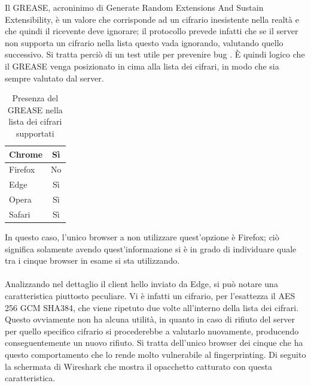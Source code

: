 Il GREASE,  acroninimo di Generate Random Extensions And Sustain Extensibility, è un valore che corrisponde ad un cifrario inesistente nella realtà e che quindi il ricevente deve ignorare; il protocollo prevede infatti che se il server non supporta un cifrario nella lista questo vada ignorando, valutando quello successivo. Si tratta perciò di un test utile per prevenire bug \cite{GREASE}.
È quindi logico che il GREASE venga posizionato in cima alla lista dei cifrari, in modo che sia sempre valutato dal server.
\\
\begin{table}[H]
	\centering
	\begin{tabular}{| l | c |}
			\hline
		\rowcolor[HTML]{FDD20A}Chrome & Sì
		\\
		\hline
		\rowcolor[HTML]{FF9500}Firefox & No
		\\
		\hline
		\rowcolor[HTML]{3277BC}Edge & Sì
		\\
		\hline
		\rowcolor[HTML]{CB0B1E}Opera & Sì
		\\
		\hline
		\rowcolor[HTML]{0FB5EE} Safari & Sì
		\\
		\hline
	\end{tabular}
	\caption{Presenza del GREASE nella lista dei cifrari supportati}
	\label{tab:grease}
\end{table}

In questo caso, l'unico browser a non utilizzare quest'opzione è Firefox; ciò significa solamente avendo quest'informazione si è in grado di individuare quale tra i cinque browser in esame si sta utilizzando.
\\ \\
Analizzando nel dettaglio il client hello inviato da Edge, si può notare una caratteristica piuttosto peculiare. Vi è infatti un cifrario, per l'esattezza il AES 256 GCM SHA384, che viene ripetuto due volte all'interno della lista dei cifrari. Questo ovviamente non ha alcuna utilità, in quanto in caso di rifiuto del server per quello specifico cifrario si procederebbe a valutarlo nuovamente, producendo conseguentemente un nuovo rifiuto. Si tratta dell'unico browser dei cinque che ha questo comportamento che lo rende molto vulnerabile al fingerprinting.
Di seguito la schermata di Wireshark che mostra il opacchetto catturato con questa caratteristica.

